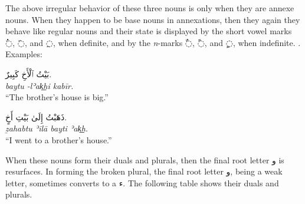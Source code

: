 \documentclass[
  10pt,
]{book}
\begin{document}
The above irregular behavior of these three nouns is only when they are annexe nouns. When they happen to be base nouns in annexations, then they again they behave like regular nouns and their state is displayed by the short vowel marks \foreignlanguage{arabic}{◌ُ}, \foreignlanguage{arabic}{◌َ}, and \foreignlanguage{arabic}{◌ِ}, when definite, and by the \emph{n}-marks
\foreignlanguage{arabic}{◌ٌ},
\foreignlanguage{arabic}{◌ً}, and
\foreignlanguage{arabic}{◌ٍ}, when indefinite.
. Examples:

\foreignlanguage{arabic}{بَيْتُ ٱلْأَخِ کَبِيرٌ.}\\
\emph{baytu -lʾak͟hi kabīr.}\\
\enquote{The brother's house is big.}

\foreignlanguage{arabic}{ذَهَبْتُ إِلَىٰ بَيْتِ أَخٍ.}\\
\emph{ẕahabtu ʾilā bayti ʾak͟h.}\\
\enquote{I went to a brother's house.}

When these nouns form their duals and plurals, then the final root letter \foreignlanguage{arabic}{و} is resurfaces.
In forming the broken plural, the final root letter \foreignlanguage{arabic}{و}, being a weak letter, sometimes converts to a \foreignlanguage{arabic}{ء}.
The following table shows their duals and plurals.
\end{document}
